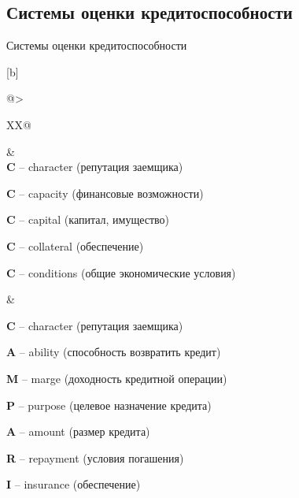 \documentclass[_Banking_p2.tex]{subfiles}
\begin{document}
\subsection{Системы оценки кредитоспособности}
\begin{frame}[shrink=15]{Системы оценки кредитоспособности}
\begin{table}[htbp]
\caption{Наиболее распространенные системы оценки кредитоспособности клиента}
  \centering
  	\begin{tabularx}{\linewidth}[b]{@{}>{\raggedright\arraybackslash}XX@{}}
    \toprule
     &  \\
    \midrule
    \textbf{C} – character (репутация заемщика) 

    \textbf{C} – capacity (финансовые возможности) 

    \textbf{C} – capital (капитал, имущество) 

    \textbf{C} – collateral (обеспечение) 

    \textbf{C} – conditions (общие экономические условия)  

    & 

    \textbf{C} – character (репутация заемщика)

    \textbf{A} – ability (способность возвратить кредит)
    
    \textbf{M} – marge (доходность кредитной операции)
    
    \textbf{P} – purpose (целевое назначение кредита)
    
    \textbf{A} – amount (размер кредита)
    
    \textbf{R} – repayment (условия погашения)
    
    \textbf{I} – insurance (обеспечение)\\
    \bottomrule
    \end{tabularx}%
  \label{tab:addlabel}%
\end{table}%

\end{frame}
\end{document}

